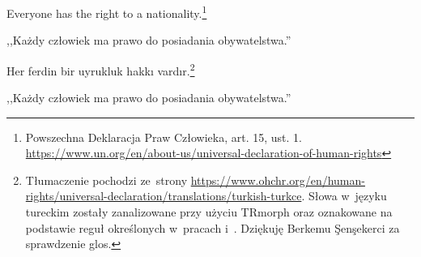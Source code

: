 \begin{exe}
\ex \label{inicjalne}
Everyone has the right to a nationality.\footnote{Powszechna Deklaracja Praw Człowieka, art. 15, ust. 1. \url{https://www.un.org/en/about-us/universal-declaration-of-human-rights}}

,,Każdy człowiek ma prawo do posiadania obywatelstwa.''

\ex \label{finalne}
Her ferdin bir uyrukluk hakkı vardır.\footnote{Tłumaczenie pochodzi ze~strony \url{https://www.ohchr.org/en/human-rights/universal-declaration/translations/turkish-turkce}. Słowa w~języku tureckim zostały zanalizowane przy użyciu TRmorph \citep{coltekin2010freely} oraz oznakowane na podstawie reguł określonych w~pracach \cite{haspelmath2014leipzig} i~\cite{bedir2021overcoming}. Dziękuję Berkemu \c{S}en\c{s}ekerci za sprawdzenie glos.}


,,Każdy człowiek ma prawo do posiadania obywatelstwa.''
\end{exe}

